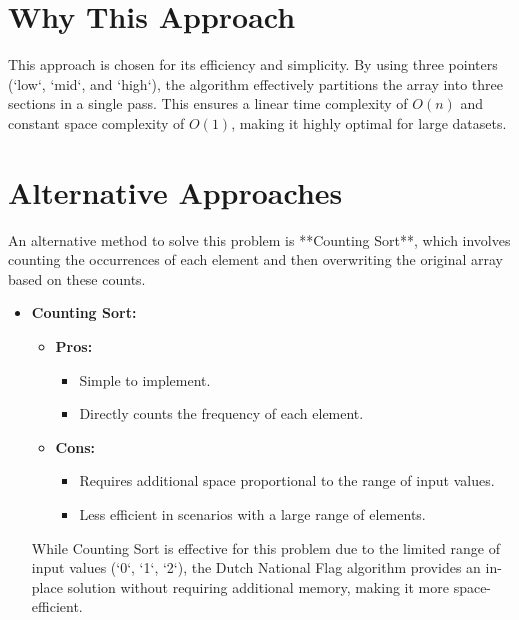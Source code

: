 \section*{Why This Approach}
This approach is chosen for its efficiency and simplicity. By using three pointers (`low`, `mid`, and `high`), the algorithm effectively partitions the array into three sections in a single pass. This ensures a linear time complexity of \(O(n)\) and constant space complexity of \(O(1)\), making it highly optimal for large datasets.

\section*{Alternative Approaches}
An alternative method to solve this problem is **Counting Sort**, which involves counting the occurrences of each element and then overwriting the original array based on these counts.

\begin{itemize}
    \item \textbf{Counting Sort:}
    \begin{itemize}
        \item \textbf{Pros:}
        \begin{itemize}
            \item Simple to implement.
            \item Directly counts the frequency of each element.
        \end{itemize}
        
        \item \textbf{Cons:}
        \begin{itemize}
            \item Requires additional space proportional to the range of input values.
            \item Less efficient in scenarios with a large range of elements.
        \end{itemize}
    \end{itemize}
    
    While Counting Sort is effective for this problem due to the limited range of input values (`0`, `1`, `2`), the Dutch National Flag algorithm provides an in-place solution without requiring additional memory, making it more space-efficient.
\end{itemize}

